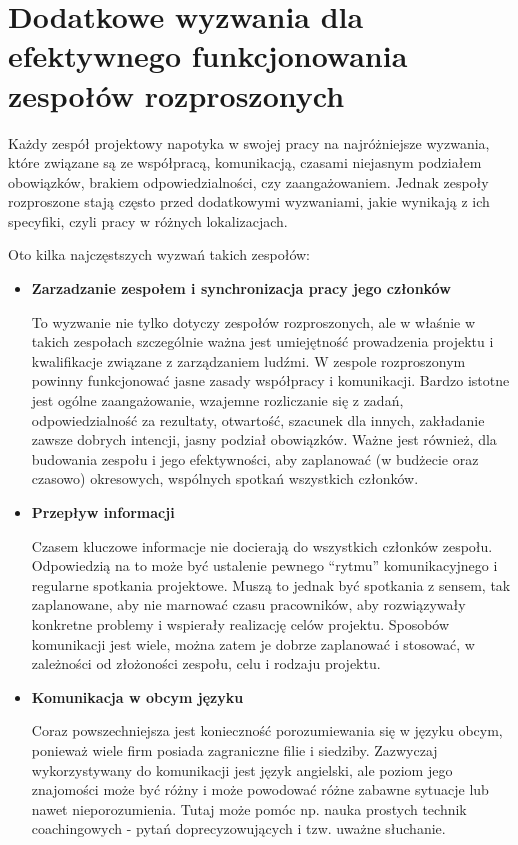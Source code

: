 \section{Dodatkowe wyzwania dla efektywnego funkcjonowania zespołów rozproszonych}

Każdy zespół projektowy napotyka w swojej pracy na najróżniejsze wyzwania,
które związane są ze współpracą, komunikacją, czasami niejasnym podziałem obowiązków,
brakiem odpowiedzialności, czy zaangażowaniem.
Jednak zespoły rozproszone stają często przed dodatkowymi wyzwaniami, jakie wynikają z ich specyfiki,
czyli pracy w różnych lokalizacjach.

Oto kilka najczęstszych wyzwań takich zespołów:

\begin{itemize}
	\item \textbf{Zarzadzanie zespołem i synchronizacja pracy jego członków}

	To wyzwanie nie tylko dotyczy zespołów rozproszonych,
	ale w właśnie w takich zespołach szczególnie ważna jest umiejętność prowadzenia projektu
	i kwalifikacje związane z zarządzaniem ludźmi.
	W zespole rozproszonym powinny funkcjonować jasne zasady współpracy i komunikacji.
	Bardzo istotne jest ogólne zaangażowanie, wzajemne rozliczanie się z zadań,
	odpowiedzialność za rezultaty, otwartość, szacunek dla innych,
	zakładanie zawsze dobrych intencji, jasny podział obowiązków.
	Ważne jest również, dla budowania zespołu i jego efektywności, aby zaplanować
	(w budżecie oraz czasowo) okresowych, wspólnych spotkań wszystkich członków.

	\item \textbf{Przepływ informacji}

	Czasem kluczowe informacje nie docierają do wszystkich członków zespołu.
	Odpowiedzią na to może być ustalenie pewnego ``rytmu'' komunikacyjnego i regularne spotkania projektowe.
	Muszą to jednak być spotkania z sensem, tak zaplanowane, aby nie marnować czasu pracowników,
	aby rozwiązywały konkretne problemy i wspierały realizację celów projektu.
	Sposobów komunikacji jest wiele, można zatem je dobrze zaplanować i stosować,
	w zależności od złożoności zespołu, celu i rodzaju projektu.

	\item \textbf{Komunikacja w obcym języku}

	Coraz powszechniejsza jest konieczność porozumiewania się w języku obcym,
	ponieważ wiele firm posiada zagraniczne filie i siedziby.
	Zazwyczaj wykorzystywany do komunikacji jest język angielski,
	ale poziom jego znajomości może być różny i może powodować różne zabawne sytuacje lub nawet nieporozumienia.
	Tutaj może pomóc np. nauka prostych technik coachingowych - pytań doprecyzowujących i tzw. uważne słuchanie.
\end{itemize}

